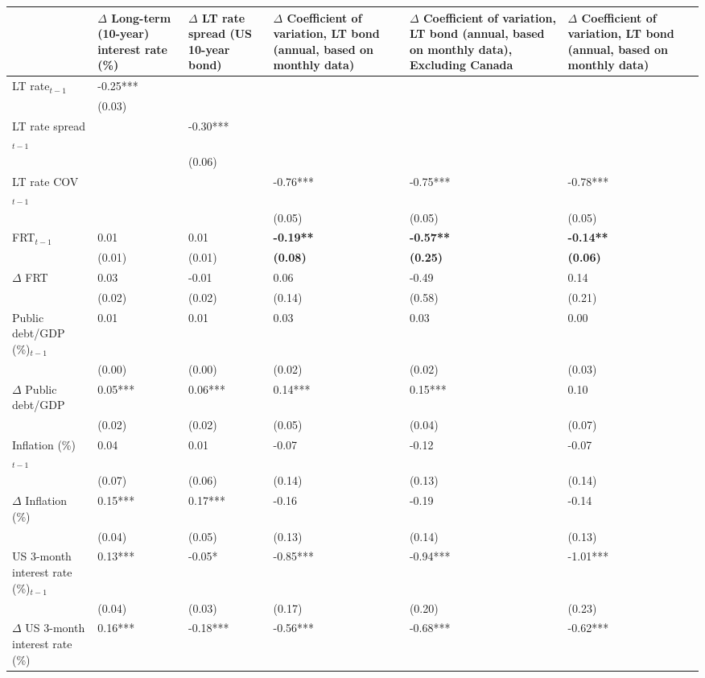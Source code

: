 {\tiny
\begin{tabular}{lp{2cm}p{2cm}p{2cm}p{2cm}p{2cm}}
  \hline
 & $\Delta$ Long-term (10-year) interest rate (\%) & $\Delta$ LT rate spread (US 10-year bond) & $\Delta$ Coefficient of variation, LT bond (annual, based on monthly data) & $\Delta$ Coefficient of variation, LT bond (annual, based on monthly data), \textbf{Excluding Canada} & $\Delta$ Coefficient of variation, LT bond (annual, based on monthly data) \\ 
  \hline
LT rate$_{t-1}$ & -0.25*** &  &  &  &  \\ 
   & (0.03) &  &  &  &  \\ 
  LT rate spread$_{t-1}$ &  & -0.30*** &  &  &  \\ 
   &  & (0.06) &  &  &  \\ 
  LT rate COV$_{t-1}$ &  &  & -0.76*** & -0.75*** & -0.78*** \\ 
   &  &  & (0.05) & (0.05) & (0.05) \\ 
  FRT$_{t-1}$ & 0.01 & 0.01 & \textbf{-0.19**} & \textbf{-0.57**} & \textbf{-0.14**} \\ 
   & (0.01) & (0.01) & \textbf{(0.08)} & \textbf{(0.25)} & \textbf{(0.06)} \\ 
  $\Delta$ FRT & 0.03 & -0.01 & 0.06 & -0.49 & 0.14 \\ 
   & (0.02) & (0.02) & (0.14) & (0.58) & (0.21) \\ 
  Public debt/GDP (\%)$_{t-1}$ & 0.01 & 0.01 & 0.03 & 0.03 & 0.00 \\ 
   & (0.00) & (0.00) & (0.02) & (0.02) & (0.03) \\ 
  $\Delta$ Public debt/GDP & 0.05*** & 0.06*** & 0.14*** & 0.15*** & 0.10 \\ 
   & (0.02) & (0.02) & (0.05) & (0.04) & (0.07) \\ 
  Inflation (\%) $_{t-1}$ & 0.04 & 0.01 & -0.07 & -0.12 & -0.07 \\ 
   & (0.07) & (0.06) & (0.14) & (0.13) & (0.14) \\ 
  $\Delta$ Inflation (\%) & 0.15*** & 0.17*** & -0.16 & -0.19 & -0.14 \\ 
   & (0.04) & (0.05) & (0.13) & (0.14) & (0.13) \\ 
  US 3-month interest rate (\%)$_{t-1}$ & 0.13*** & -0.05* & -0.85*** & -0.94*** & -1.01*** \\ 
   & (0.04) & (0.03) & (0.17) & (0.20) & (0.23) \\ 
  $\Delta$ US 3-month interest rate (\%) & 0.16*** & -0.18*** & -0.56*** & -0.68*** & -0.62*** \\ 

\end{tabular}}
